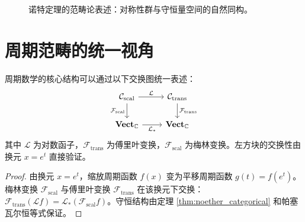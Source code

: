 \begin{figure}[htbp]
\centering
{}
\caption{诺特定理的范畴论表述：对称性群与守恒量空间的自然同构。}
\label{fig:noether_categorical}
\end{figure}

\section{周期范畴的统一视角}\label{sec:periodic_category_unification}

\begin{theorem}[周期数学的范畴论统一]\label{thm:periodic_category_unification}
周期数学的核心结构可以通过以下交换图统一表述：
\[
\begin{tikzcd}
\mathcal{C}_{\text{scal}} \arrow[r, "\mathcal{L}"] \arrow[d, "\mathcal{F}_{\text{scal}}"'] & \mathcal{C}_{\text{trans}} \arrow[d, "\mathcal{F}_{\text{trans}}"] \\
\mathbf{Vect}_{\mathbb{C}} \arrow[r, "\mathcal{L}_*"'] & \mathbf{Vect}_{\mathbb{C}}
\end{tikzcd}
\]
其中 $\mathcal{L}$ 为对数函子，$\mathcal{F}_{\text{trans}}$ 为傅里叶变换，$\mathcal{F}_{\text{scal}}$ 为梅林变换。左方块的交换性由换元 $x = e^t$ 直接验证。
\end{theorem}

\begin{proof}
由换元 $x = e^t$，缩放周期函数 $f(x)$ 变为平移周期函数 $g(t) = f(e^t)$。梅林变换 $\mathcal{F}_{\text{scal}}$ 与傅里叶变换 $\mathcal{F}_{\text{trans}}$ 在该换元下交换：$\mathcal{F}_{\text{trans}}(\mathcal{L}f) = \mathcal{L}_*(\mathcal{F}_{\text{scal}}f)$。守恒结构由定理 \ref{thm:noether_categorical} 和帕塞瓦尔恒等式保证。
\end{proof}

